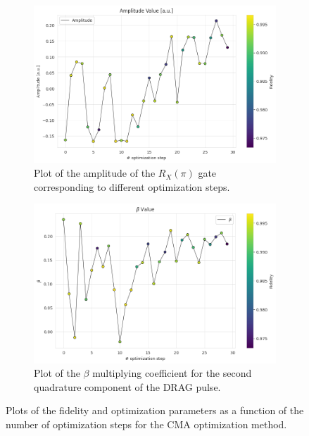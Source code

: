 \begin{figure}[h]
    \begin{subfigure}[t]{0.45\textwidth}
        \includegraphics[width=\textwidth]{figures/png/RB_optimization/CMA/CMA_amplitude.png}
        \caption{Plot of the amplitude of the $R_X(\pi)$ gate corresponding to different optimization steps.}
        \label{fig:CMA:amplitude}
    \end{subfigure}
    \hfill
    \begin{subfigure}[t]{0.45\textwidth}
        \includegraphics[width=\textwidth]{figures/png/RB_optimization/CMA/beta_CMA.png}
        \caption{Plot of the $\beta$ multiplying coefficient for the second quadrature component of the DRAG pulse.}
        \label{fig:CMA:beta}
    \end{subfigure}

    \caption{Plots of the fidelity and optimization parameters as a function of the number of optimization steps for the CMA optimization method.}
    \label{fig:CMA_plots}
\end{figure}

